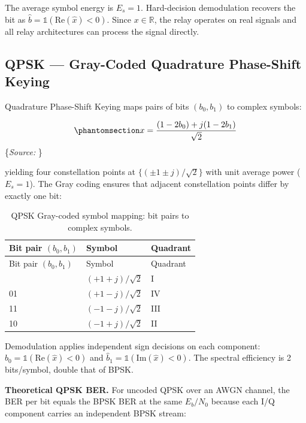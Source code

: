 \documentclass[
  english,
  12pt,
  12pt,
  a4paper,
  oneside]{report}
\begin{document}
The average symbol energy is \(E_s = 1\). Hard-decision demodulation recovers the bit as \(\hat{b} = \mathbb{1}(\text{Re}(\hat{x}) < 0)\). Since \(x \in \mathbb{R}\), the relay operates on real signals and all relay architectures can process the signal directly.

\subsection{QPSK --- Gray-Coded Quadrature Phase-Shift Keying}\label{sec:qpsk-gray-coded-quadrature-phase-shift-keying}

Quadrature Phase-Shift Keying maps pairs of bits \((b_0, b_1)\) to complex symbols:

\begin{equation}\protect\phantomsection\label{eq:qpsk-mapping}{x = \frac{(1 - 2b_0) + j(1 - 2b_1)}{\sqrt{2}}
}\end{equation} \footnotesize\{\textit{Source: \1}\}\normalsize

yielding four constellation points at \(\{(\pm 1 \pm j)/\sqrt{2}\}\) with unit average power (\(E_s = 1\)). The Gray coding ensures that adjacent constellation points differ by exactly one bit:

\begin{longtable}[]{@{}lll@{}}
\caption{QPSK Gray-coded symbol mapping: bit pairs to complex symbols.}\label{tbl:table29}\tabularnewline
\toprule\noalign{}
Bit pair \((b_0, b_1)\) & Symbol & Quadrant \\
\midrule\noalign{}
\endfirsthead
\toprule\noalign{}
Bit pair \((b_0, b_1)\) & Symbol & Quadrant \\
\midrule\noalign{}
\endhead
\bottomrule\noalign{}
\endlastfoot
00 & \((+1+j)/\sqrt{2}\) & I \\
01 & \((+1-j)/\sqrt{2}\) & IV \\
11 & \((-1-j)/\sqrt{2}\) & III \\
10 & \((-1+j)/\sqrt{2}\) & II \\
\end{longtable}

Demodulation applies independent sign decisions on each component: \(\hat{b}_0 = \mathbb{1}(\text{Re}(\hat{x}) < 0)\) and \(\hat{b}_1 = \mathbb{1}(\text{Im}(\hat{x}) < 0)\). The spectral efficiency is 2 bits/symbol, double that of BPSK.

\textbf{Theoretical QPSK BER.} For uncoded QPSK over an AWGN channel, the BER per bit equals the BPSK BER at the same \(E_b/N_0\) because each I/Q component carries an independent BPSK stream:
\end{document}
